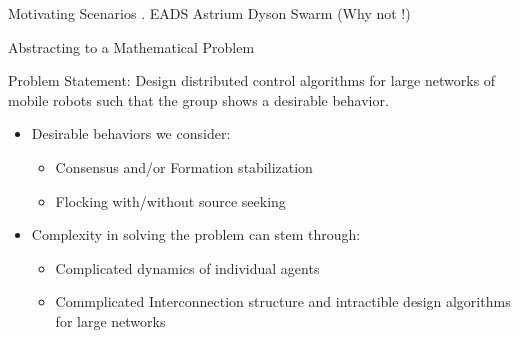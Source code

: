 \documentclass{beamer}
\begin{document}
\begin{frame}{Motivating Scenarios}
	.
	\hspace{0.5 cm}
	EADS Astrium 
	\hspace{1.7 cm}
	Dyson Swarm (Why not !)
	\\
\end{frame}
\begin{frame}{Abstracting to a Mathematical Problem}	
\begin{block}{Problem Statement:}
Design distributed control algorithms for large networks of mobile robots such that the group shows a desirable behavior.
\end{block}
\begin{itemize}
	\item Desirable behaviors we consider:
	\begin{itemize}
		\item Consensus and/or Formation stabilization
		\item Flocking with/without source seeking
	\end{itemize}	
	\item Complexity in solving the problem can stem through:
	\begin{itemize}
		\item Complicated dynamics of individual agents
		\item Commplicated Interconnection structure and intractible design algorithms for large networks
	\end{itemize}
\end{itemize}
\end{frame}
\end{document}
